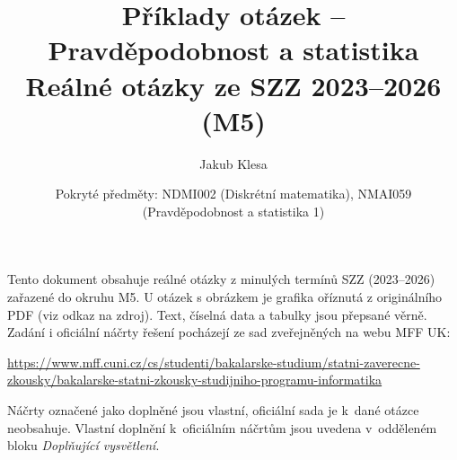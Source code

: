 \documentclass[11pt,a4paper]{article}
\title{Příklady otázek -- Pravděpodobnost a statistika\\[0.3em]\large Reálné otázky ze SZZ 2023--2026 (M5)}
\author{Jakub Klesa}
\date{Pokryté předměty: NDMI002 (Diskrétní matematika), NMAI059 (Pravděpodobnost a statistika 1)}
\begin{document}
\maketitle
\tableofcontents
\bigskip

\begin{poznamka}
Tento dokument obsahuje reálné otázky z minulých termínů SZZ (2023--2026) zařazené do
okruhu M5. U otázek s obrázkem je grafika oříznutá z originálního PDF (viz odkaz na
zdroj). Text, číselná data a tabulky jsou přepsané věrně.
Zadání i oficiální náčrty řešení pocházejí ze sad zveřejněných na webu MFF UK:\par
{\raggedright\url{https://www.mff.cuni.cz/cs/studenti/bakalarske-studium/statni-zaverecne-zkousky/bakalarske-statni-zkousky-studijniho-programu-informatika}\par}
Náčrty označené jako doplněné jsou vlastní, oficiální sada je k~dané otázce neobsahuje.
Vlastní doplnění k~oficiálním náčrtům jsou uvedena v~odděleném bloku \emph{Doplňující vysvětlení}.
\end{poznamka}
\bigskip



\end{document}
